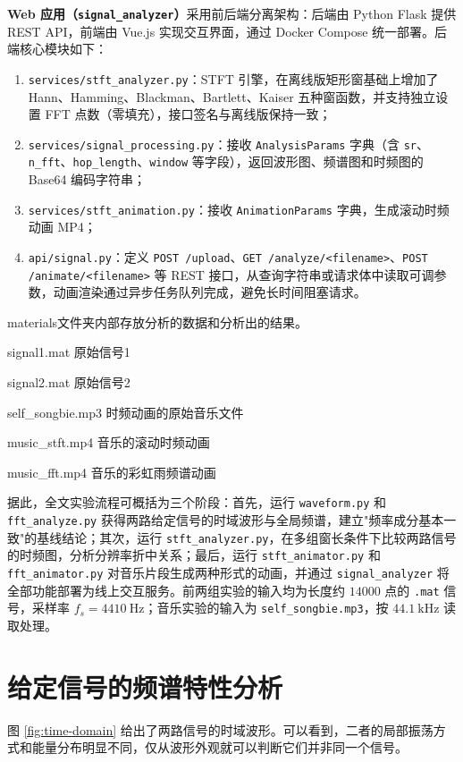 \documentclass[12pt,a4paper,UTF8]{ctexart}
\begin{document}
\textbf{Web 应用（\texttt{signal\_analyzer}）}采用前后端分离架构：后端由 Python Flask 提供 REST API，前端由 Vue.js 实现交互界面，通过 Docker Compose 统一部署。后端核心模块如下：
\begin{enumerate}
    \item \texttt{services/stft\_analyzer.py}：STFT 引擎，在离线版矩形窗基础上增加了 Hann、Hamming、Blackman、Bartlett、Kaiser 五种窗函数，并支持独立设置 FFT 点数（零填充），接口签名与离线版保持一致；
    \item \texttt{services/signal\_processing.py}：接收 \texttt{AnalysisParams} 字典（含 \texttt{sr}、\texttt{n\_fft}、\texttt{hop\_length}、\texttt{window} 等字段），返回波形图、频谱图和时频图的 Base64 编码字符串；
    \item \texttt{services/stft\_animation.py}：接收 \texttt{AnimationParams} 字典，生成滚动时频动画 MP4；
    \item \texttt{api/signal.py}：定义 \texttt{POST /upload}、\texttt{GET /analyze/<filename>}、\texttt{POST /animate/<filename>} 等 REST 接口，从查询字符串或请求体中读取可调参数，动画渲染通过异步任务队列完成，避免长时间阻塞请求。
\end{enumerate}

materials文件夹内部存放分析的数据和分析出的结果。

signal1.mat  原始信号1

signal2.mat  原始信号2

self\_songbie.mp3  时频动画的原始音乐文件

music\_stft.mp4  音乐的滚动时频动画

music\_fft.mp4  音乐的彩虹雨频谱动画

据此，全文实验流程可概括为三个阶段：首先，运行 \texttt{waveform.py} 和 \texttt{fft\_analyze.py} 获得两路给定信号的时域波形与全局频谱，建立"频率成分基本一致"的基线结论；其次，运行 \texttt{stft\_analyzer.py}，在多组窗长条件下比较两路信号的时频图，分析分辨率折中关系；最后，运行 \texttt{stft\_animator.py} 和 \texttt{fft\_animator.py} 对音乐片段生成两种形式的动画，并通过 \texttt{signal\_analyzer} 将全部功能部署为线上交互服务。前两组实验的输入均为长度约 $14000$ 点的 \texttt{.mat} 信号，采样率 $f_s=4410\ \mathrm{Hz}$；音乐实验的输入为 \texttt{self\_songbie.mp3}，按 $44.1\ \mathrm{kHz}$ 读取处理。

\section{给定信号的频谱特性分析}
图 \ref{fig:time-domain} 给出了两路信号的时域波形。可以看到，二者的局部振荡方式和能量分布明显不同，仅从波形外观就可以判断它们并非同一个信号。
\end{document}
